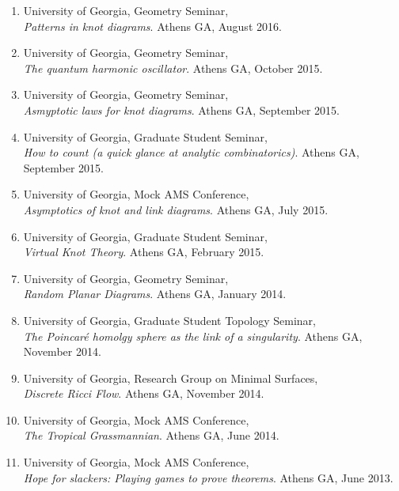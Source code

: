 \documentclass[letterpaper]{article}
\begin{document}
\begin{enumerate}
  
\item University of Georgia, Geometry Seminar, \\
  \textit{Patterns in knot diagrams}. Athens GA, August 2016. 

\item University of Georgia, Geometry Seminar,\\
  \textit{The quantum harmonic oscillator}. Athens GA, October 2015.
  
\item University of Georgia, Geometry Seminar, \\
  \textit{Asmyptotic laws for knot diagrams}. Athens GA, September 2015.
  
\item University of Georgia, Graduate Student Seminar, \\
  \textit{How to count (a quick glance at analytic combinatorics)}. Athens GA, September 2015.
  
\item University of Georgia, Mock AMS Conference, \\
  \textit{Asymptotics of knot and link diagrams}. Athens GA, July 2015.

\item University of Georgia, Graduate Student Seminar,\\
  \textit{Virtual Knot Theory}. Athens GA, February 2015.
  
\item University of Georgia, Geometry Seminar,\\
  \textit{Random Planar Diagrams}. Athens GA, January 2014.
  
\item University of Georgia, Graduate Student Topology Seminar,\\
  \textit{The Poincar\'e homolgy sphere as the link of a singularity}. Athens GA, November 2014.
  
\item University of Georgia, Research Group on Minimal Surfaces, \\
  \textit{Discrete Ricci Flow}. Athens GA, November 2014.
  
\item University of Georgia, Mock AMS Conference, \\
  \textit{The Tropical Grassmannian}. Athens GA, June 2014.
  
\item University of Georgia, Mock AMS Conference, \\
  \textit{Hope for slackers: Playing games to prove theorems}. Athens GA, June 2013.
  

\end{enumerate}
\end{document}
